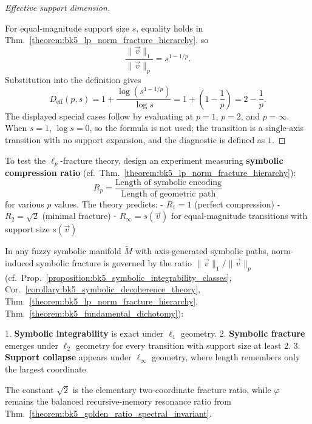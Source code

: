 \begin{proof}[Effective support dimension]
\label{proof:bk5_fractal_dimension_connection}
\leavevmode

For equal-magnitude support size $s$, equality holds in
Thm.~\ref{theorem:bk5_lp_norm_fracture_hierarchy}, so
\[
\frac{\|\vec{v}\|_1}{\|\vec{v}\|_p}=s^{1-1/p}.
\]
Substitution into the definition gives
\[
D_{\mathrm{eff}}(p,s)
=1+\frac{\log(s^{1-1/p})}{\log s}
=1+\left(1-\frac1p\right)
=2-\frac1p.
\]
The displayed special cases follow by evaluating at $p=1$, $p=2$, and
$p=\infty$.  When $s=1$, $\log s=0$, so the formula is not used; the transition
is a single-axis transition with no support expansion, and the diagnostic is
defined as $1$.
\end{proof}

\begin{definition}
\label{definition:bk5_symbolic_compression_experiment}
To test the $\ell_p$-fracture theory, design an experiment measuring \textbf{symbolic compression ratio} (cf.~Thm.~\ref{theorem:bk5_lp_norm_fracture_hierarchy}):
$$R_p = \frac{\text{Length of symbolic encoding}}{\text{Length of geometric path}}$$
for various $p$ values. The theory predicts:
- $R_1 = 1$ (perfect compression)
- $R_2 = \sqrt{2}$ (minimal fracture)
- $R_\infty = s(\vec{v})$ for equal-magnitude transitions with support size $s(\vec{v})$
\end{definition}

\begin{theorem}
\label{theorem:bk5_fundamental_norm_fracture}
In any fuzzy symbolic manifold $\tilde{M}$ with axis-generated symbolic paths,
norm-induced symbolic fracture is governed by the ratio
$\|\vec{v}\|_1/\|\vec{v}\|_p$ (cf.~Prop.~\ref{proposition:bk5_symbolic_integrability_classes},
Cor.~\ref{corollary:bk5_symbolic_decoherence_theory},
Thm.~\ref{theorem:bk5_lp_norm_fracture_hierarchy},
Thm.~\ref{theorem:bk5_fundamental_dichotomy}):

1. \textbf{Symbolic integrability} is exact under $\ell_1$ geometry.
2. \textbf{Symbolic fracture} emerges under $\ell_2$ geometry for every transition with support size at least $2$.
3. \textbf{Support collapse} appears under $\ell_\infty$ geometry, where length remembers only the largest coordinate.

The constant $\sqrt{2}$ is the elementary two-coordinate fracture ratio, while
$\varphi$ remains the balanced recursive-memory resonance ratio from
Thm.~\ref{theorem:bk5_golden_ratio_spectral_invariant}.
\end{theorem}

